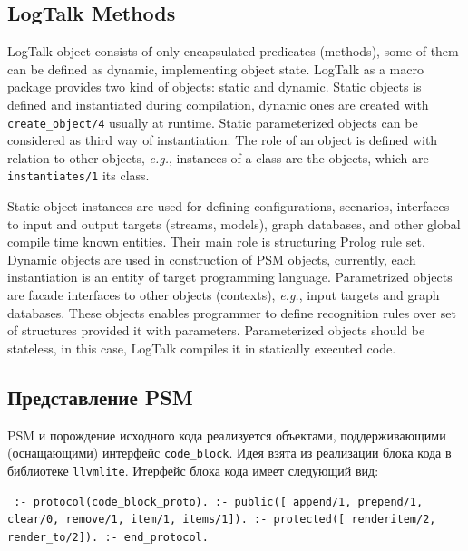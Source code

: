 \documentclass[conference]{IEEEtran} \IEEEoverridecommandlockouts
\begin{document}
\subsection{LogTalk Methods} \label{sec:lgt-methods} 

LogTalk object consists of only encapsulated predicates (methods), some of them can be defined as dynamic, implementing object state. LogTalk as a macro package provides two kind of objects: static and dynamic. Static objects is defined and instantiated during compilation, dynamic ones are created with \texttt{create\_object/4} usually at runtime. Static parameterized objects can be considered as third way of instantiation. The role of an object is defined with relation to other objects, \emph{e.g.}, instances of a class are the objects, which are \verb|instantiates/1| its class. 

Static object instances are used for defining configurations, scenarios, interfaces to input and output targets (streams, models), graph databases, and other global compile time known entities. Their main role is structuring Prolog rule set. Dynamic objects are used in construction of PSM objects, currently, each instantiation is an entity of target programming language. Parametrized objects are facade interfaces to other objects (contexts), \emph{e.g.}, input targets and graph databases. These objects enables programmer to define recognition rules over set of structures provided it with parameters. Parameterized objects should be stateless, in this case, LogTalk compiles it in statically executed code. 

\subsection{Представление PSM} \label{sec:blocks} 

PSM и порождение исходного кода реализуется объектами, поддерживающими (оснащающими) интерфейс \texttt{code\_block}. Идея взята из реализации блока кода в библиотеке \verb|llvmlite|. Итерфейс блока кода имеет следующий вид: \begin{verbatim} :- protocol(code_block_proto). :- public([ append/1, prepend/1, clear/0, remove/1, item/1, items/1]). :- protected([ renderitem/2, render_to/2]). :- end_protocol. \end{verbatim} 
\end{document}
